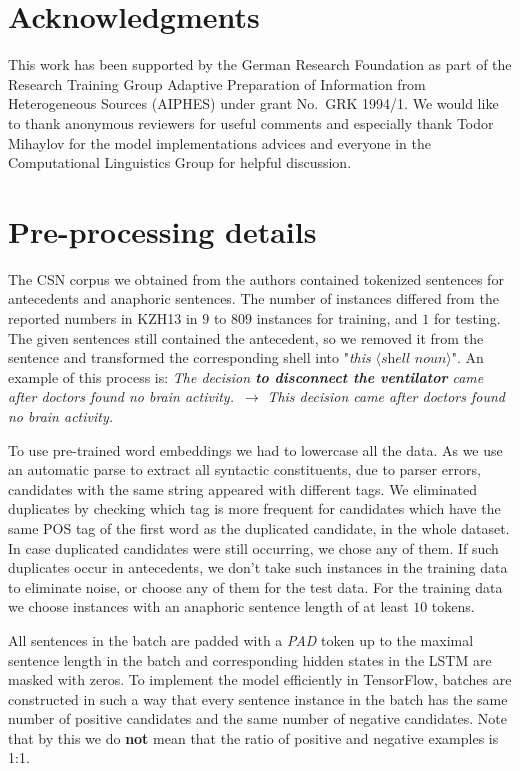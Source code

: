 \documentclass[11pt,letterpaper]{article}
\begin{document}
 	\section*{Acknowledgments}

This work has been supported by the German Research Foundation as part of the Research Training Group Adaptive Preparation of Information from Heterogeneous Sources (AIPHES) under grant No.\ GRK 1994/1.
We would like to thank anonymous reviewers for useful comments and especially thank Todor Mihaylov for the model implementations advices and everyone in the Computational Linguistics Group for helpful discussion. 
	
	
	\appendix
	\section{Pre-processing details}
The CSN corpus we obtained from the authors contained tokenized sentences for antecedents and anaphoric sentences. The number of instances differed from the reported numbers in KZH13 in $9$ to $809$ instances for training, and $1$ for testing. The given 
sentences still contained the antecedent, so we removed it from the sentence and transformed the corresponding shell into "\textit{this} $\langle \textit{shell noun} \rangle$". 
An example of this process is:
\textit{The decision \textbf{to disconnect the ventilator} came after doctors found no brain activity.}\ $\rightarrow$ \textit{This decision came after doctors found no brain activity.}

To use pre-trained word embeddings we had to lowercase all the data. As we use an automatic parse to extract all syntactic constituents, due to parser errors, candidates with the same string appeared with different tags. We eliminated duplicates by checking which tag is more frequent for candidates which have the same POS tag of the first word as the duplicated candidate, in the whole dataset. In case duplicated candidates were still occurring, we chose any of them. If such duplicates occur in antecedents, we don't take such instances in the training data to eliminate noise, or choose any of them for the test data. For the training data we choose instances with an anaphoric sentence length of at least $10$ tokens. 

All sentences in the batch are padded with a \textit{PAD} token up to the maximal sentence length in the batch and corresponding hidden states in the LSTM are masked with zeros. To implement the model efficiently in TensorFlow, batches are constructed in such a way that every sentence instance in the batch has the same number of positive candidates and the same number of negative candidates. Note that by this we do \textbf{not} mean that the ratio of positive and negative examples is 1:1.
\end{document}
